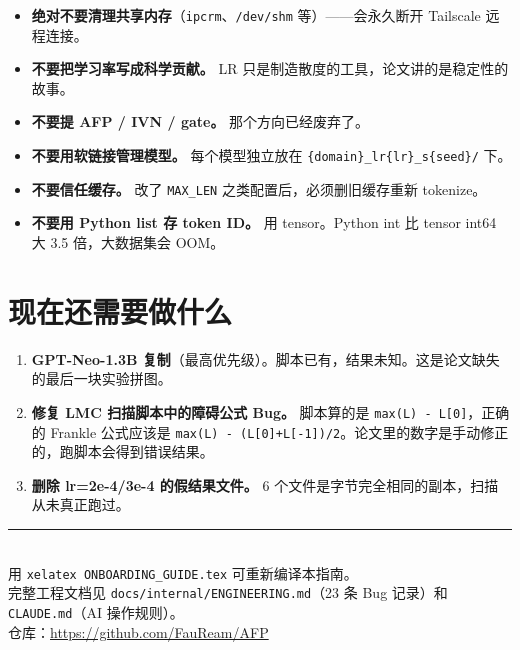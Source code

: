 \documentclass[12pt,a4paper]{ctexart}
\newcommand{\code}[1]{\texttt{\small #1}}
\begin{document}
\begin{itemize}
  \item \textbf{绝对不要清理共享内存}（\code{ipcrm}、\code{/dev/shm} 等）——会永久断开 Tailscale 远程连接。
  \item \textbf{不要把学习率写成科学贡献。} LR 只是制造散度的工具，论文讲的是稳定性的故事。
  \item \textbf{不要提 AFP / IVN / gate。} 那个方向已经废弃了。
  \item \textbf{不要用软链接管理模型。} 每个模型独立放在 \code{\{domain\}\_lr\{lr\}\_s\{seed\}/} 下。
  \item \textbf{不要信任缓存。} 改了 \code{MAX\_LEN} 之类配置后，必须删旧缓存重新 tokenize。
  \item \textbf{不要用 Python list 存 token ID。} 用 tensor。Python int 比 tensor int64 大 3.5 倍，大数据集会 OOM。
\end{itemize}

\section{现在还需要做什么}

\begin{enumerate}
  \item \textbf{GPT-Neo-1.3B 复制}（最高优先级）。脚本已有，结果未知。这是论文缺失的最后一块实验拼图。
  \item \textbf{修复 LMC 扫描脚本中的障碍公式 Bug。} 脚本算的是 \code{max(L) - L[0]}，正确的 Frankle 公式应该是 \code{max(L) - (L[0]+L[-1])/2}。论文里的数字是手动修正的，跑脚本会得到错误结果。
  \item \textbf{删除 lr=2e-4/3e-4 的假结果文件。} 6 个文件是字节完全相同的副本，扫描从未真正跑过。
\end{enumerate}

\vfill
\begin{center}
\rule{0.4\textwidth}{0.4pt}\\[6pt]
{\small\color{gray}用 \code{xelatex ONBOARDING\_GUIDE.tex} 可重新编译本指南。\\
完整工程文档见 \code{docs/internal/ENGINEERING.md}（23 条 Bug 记录）和 \code{CLAUDE.md}（AI 操作规则）。\\
仓库：\url{https://github.com/FauReam/AFP}}
\end{center}
\end{document}
